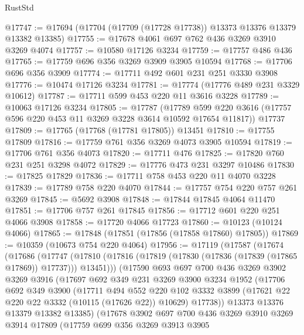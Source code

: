 \begin{lexlean}{RustStd}
\begin{coremodule}
@17747 := @17694 (@17704 (@17709 (@17728 @17738)) @13373 @13376 @13379 @13382 @13385)
@17755 := @17678 @4061 @697 @762 @436 @3269 @3910 @3269 @4074
@17757 := @10580 @17126 @3234
@17759 := @17757 @486 @436
@17765 := @17759 @696 @356 @3269 @3909 @3905 @10594
@17768 := @17706 @696 @356 @3909
@17774 := @17711 @492 @601 @231 @251 @3330 @3908
@17776 := @10474 @17126 @3234
@17781 := @17774 (@17776 @489 @231 @3329 @10612)
@17787 := @17711 @599 @453 @220 @11 @3616 @3228
@17789 := @10063 @17126 @3234
@17805 := @17787
    (@17789 @599 @220 @3616 (@17757 @596 @220 @453 @11 @3269 @3228 @3614 @10592 @17654 @11817))
    @17737
@17809 := @17765 (@17768 (@17781 @17805)) @13451
@17810 := @17755 @17809
@17816 := @17759 @761 @356 @3269 @4073 @3905 @10594
@17819 := @17706 @761 @356 @4073
@17820 := @17711 @476
@17825 := @17820 @760 @231 @251 @3298 @4072
@17829 := @17776 @473 @231 @3297 @10486
@17830 := @17825 @17829
@17836 := @17711 @758 @453 @220 @11 @4070 @3228
@17839 := @17789 @758 @220 @4070
@17844 := @17757 @754 @220 @757 @261 @3269
@17845 := @5692 @3908
@17848 := @17844 @17845 @4064 @11470
@17851 := @17706 @757 @261 @17845
@17856 := @17712 @601 @220 @251 @4066 @3908
@17858 := @17720 @4066 @17723
@17860 := @10123 (@10124 @4066)
@17865 := @17848 (@17851 (@17856 (@17858 @17860) @17805))
@17869 := @10359 (@10673 @754 @220 @4064)
@17956 := @17119
    (@17587
      (@17674
        (@17686
          (@17747
            (@17810 (@17816 (@17819 (@17830 (@17836 (@17839 (@17865 @17869)) @17737))) @13451)))
          (@17590
            @693
            @697
            @700
            @436
            @3269
            @3902
            @3269
            @3916
            (@17697
              @692
              @349
              @231
              @3269
              @3900
              @3234
              @1952
              (@17706
                @692
                @349
                @3900
                (@17711
                  @494
                  @552
                  @220
                  @102
                  @3332
                  @3899
                  (@17621 @22 @220 @22 @3332 (@10115 (@17626 @22)) @10629)
                  @17738))
              @13373
              @13376
              @13379
              @13382
              @13385)
            (@17678
              @3902
              @697
              @700
              @436
              @3269
              @3910
              @3269
              @3914
              @17809
              (@17759
                @699
                @356
                @3269
                @3913
                @3905

\end{coremodule}
\end{lexlean}

